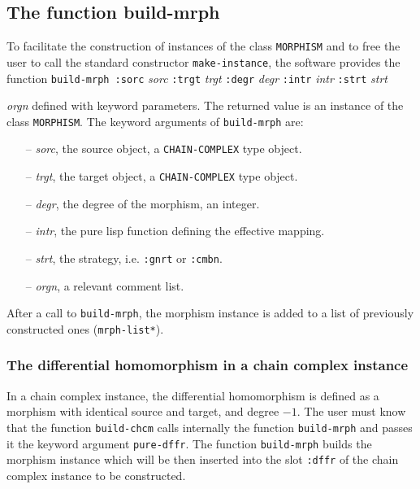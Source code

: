 \subsection {The function build-mrph}

To facilitate the construction of instances of the class {\tt MORPHISM} and to free  the user to call
the standard constructor {\tt make-instance}, the software provides the function
\vskip 0.35cm
{\tt build-mrph :sorc} {\em sorc} {\tt :trgt} {\em trgt} {\tt :degr} {\em degr} {\tt :intr} {\em intr}
{\tt :strt} {\em strt} \par
\hspace*{22.5mm}{\tt :orgn} {\em orgn}
\vskip 0.35cm
defined with keyword parameters. The returned value is an instance of the class {\tt MORPHISM}.
The keyword arguments of {\tt build-mrph} are:

\begin{itemize}
\item [--] {\em sorc}, the source object, a {\tt CHAIN-COMPLEX} type object.
\item [--] {\em trgt}, the target object, a {\tt CHAIN-COMPLEX} type object.
\item [--] {\em degr}, the degree of the morphism, an integer.
\item [--] {\em intr}, the pure lisp function defining the effective mapping.
\item [--] {\em strt}, the strategy, i.e. {\tt :gnrt} or {\tt :cmbn}.
\item [--] {\em orgn}, a relevant comment list.
\end{itemize}

After a call to {\tt build-mrph}, the morphism instance 
is added to a list of previously constructed  ones ({\tt *mrph-list*}).

\subsubsection {The differential homomorphism in a chain complex instance}

In a  chain complex instance, the differential homomorphism is defined as a morphism 
with identical source and target, and degree $-1$. The user must know that the  function {\tt build-chcm} 
calls internally the function {\tt build-mrph} and passes it the keyword argument
{\tt pure-dffr}. The function {\tt build-mrph} builds
the  morphism instance which will be then inserted into the slot {\tt :dffr} of the chain complex instance
to be constructed.

